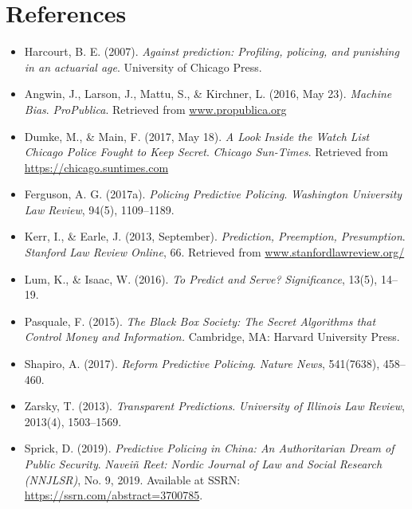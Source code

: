 \documentclass[man, noextraspace]{apa7} %
\begin{document}
\section{References}
\begin{itemize}

\item Harcourt, B. E. (2007). \textit{Against prediction: Profiling, policing, and punishing in an actuarial age}. University of Chicago Press.

\item Angwin, J., Larson, J., Mattu, S., \& Kirchner, L. (2016, May 23). \textit{Machine Bias}. \textit{ProPublica}. Retrieved from \url{www.propublica.org}

\item Dumke, M., \& Main, F. (2017, May 18). \textit{A Look Inside the Watch List Chicago Police Fought to Keep Secret}. \textit{Chicago Sun-Times}. Retrieved from \url{https://chicago.suntimes.com}

\item Ferguson, A. G. (2017a). \textit{Policing Predictive Policing}. \textit{Washington University Law Review}, 94(5), 1109–1189.

\item Kerr, I., \& Earle, J. (2013, September). \textit{Prediction, Preemption, Presumption}. \textit{Stanford Law Review Online}, 66. Retrieved from \url{www.stanfordlawreview.org/}

\item Lum, K., \& Isaac, W. (2016). \textit{To Predict and Serve?} \textit{Significance}, 13(5), 14–19.

\item Pasquale, F. (2015). \textit{The Black Box Society: The Secret Algorithms that Control Money and Information.} Cambridge, MA: Harvard University Press.

\item Shapiro, A. (2017). \textit{Reform Predictive Policing}. \textit{Nature News}, 541(7638), 458–460.

\item Zarsky, T. (2013). \textit{Transparent Predictions}. \textit{University of Illinois Law Review}, 2013(4), 1503–1569.

\item Sprick, D. (2019). \textit{Predictive Policing in China: An Authoritarian Dream of Public Security}. \textit{Naveiñ Reet: Nordic Journal of Law and Social Research (NNJLSR)}, No. 9, 2019. Available at SSRN: \url{https://ssrn.com/abstract=3700785}.


\end{itemize}
\end{document}

